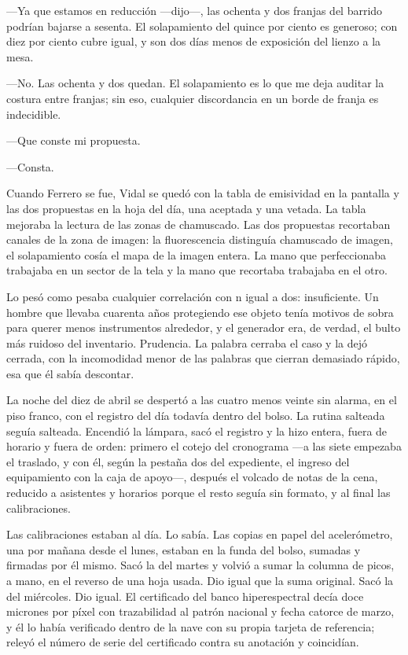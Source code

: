 ---Ya que estamos en reducción ---dijo---, las ochenta y dos franjas del barrido podrían bajarse a sesenta. El solapamiento del quince por ciento es generoso; con diez por ciento cubre igual, y son dos días menos de exposición del lienzo a la mesa.

---No. Las ochenta y dos quedan. El solapamiento es lo que me deja auditar la costura entre franjas; sin eso, cualquier discordancia en un borde de franja es indecidible.

---Que conste mi propuesta.

---Consta.

Cuando Ferrero se fue, Vidal se quedó con la tabla de emisividad en la pantalla y las dos propuestas en la hoja del día, una aceptada y una vetada. La tabla mejoraba la lectura de las zonas de chamuscado. Las dos propuestas recortaban canales de la zona de imagen: la fluorescencia distinguía chamuscado de imagen, el solapamiento cosía el mapa de la imagen entera. La mano que perfeccionaba trabajaba en un sector de la tela y la mano que recortaba trabajaba en el otro.

Lo pesó como pesaba cualquier correlación con n igual a dos: insuficiente. Un hombre que llevaba cuarenta años protegiendo ese objeto tenía motivos de sobra para querer menos instrumentos alrededor, y el generador era, de verdad, el bulto más ruidoso del inventario. Prudencia. La palabra cerraba el caso y la dejó cerrada, con la incomodidad menor de las palabras que cierran demasiado rápido, esa que él sabía descontar.


\scenebreak


La noche del diez de abril se despertó a las cuatro menos veinte sin alarma, en el piso franco, con el registro del día todavía dentro del bolso. La rutina salteada seguía salteada. Encendió la lámpara, sacó el registro y la hizo entera, fuera de horario y fuera de orden: primero el cotejo del cronograma ---a las siete empezaba el traslado, y con él, según la pestaña dos del expediente, el ingreso del equipamiento con la caja de apoyo---, después el volcado de notas de la cena, reducido a asistentes y horarios porque el resto seguía sin formato, y al final las calibraciones.

Las calibraciones estaban al día. Lo sabía. Las copias en papel del acelerómetro, una por mañana desde el lunes, estaban en la funda del bolso, sumadas y firmadas por él mismo. Sacó la del martes y volvió a sumar la columna de picos, a mano, en el reverso de una hoja usada. Dio igual que la suma original. Sacó la del miércoles. Dio igual. El certificado del banco hiperespectral decía doce micrones por píxel con trazabilidad al patrón nacional y fecha catorce de marzo, y él lo había verificado dentro de la nave con su propia tarjeta de referencia; releyó el número de serie del certificado contra su anotación y coincidían.

